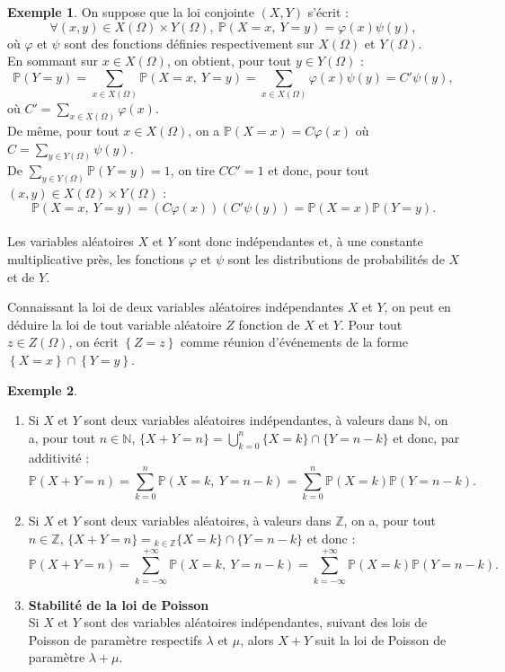 \documentclass[french]{article}
\renewcommand{\P}{\mathbb{P}}
\newcommand{\N}{\mathbb{N}}
\newcommand{\Z}{\mathbb{Z}}
\theoremstyle{plain}
\theoremstyle{definition}
\newtheorem*{ex}{Exemple}
\theoremstyle{remark}
\begin{document}
\begin{ex}
	On suppose que la loi conjointe $(X,Y)$ s'écrit :
	$$\forall (x,y)\in X(\Omega)\times Y(\Omega),\ \P(X=x,\ Y=y)=\varphi(x)\psi(y),$$ où $\varphi$ et $\psi$ sont des fonctions définies respectivement sur $X(\Omega)$ et $Y(\Omega)$. \\
	En sommant sur $x\in X(\Omega)$, on obtient, pour tout $y\in Y(\Omega)$ : $$\P(Y=y)=\sum_{x\in X(\Omega)}\P(X=x,\ Y=y)=\sum_{x\in X(\Omega)}\varphi(x)\psi(y)=C'\psi(y),$$ où $C'=\displaystyle\sum_{x\in X(\Omega)}\varphi(x)$.\\
	De même, pour tout $x\in X(\Omega)$, on a $\P(X=x)=C\varphi(x)$ où $C=\displaystyle\sum_{y\in Y(\Omega)}\psi(y)$. \\
	De $\displaystyle\sum_{y\in Y(\Omega)}\P(Y=y)=1$, on tire $CC'=1$ et donc, pour tout $(x,y)\in X(\Omega)\times Y(\Omega)$ :
	$$\P(X=x,\ Y=y)=(C\varphi(x))(C'\psi(y))=\P(X=x)\P(Y=y).$$
	\\
	Les variables aléatoires $X$ et $Y$ sont donc indépendantes et, à une constante multiplicative près, les fonctions $\varphi$ et $\psi$ sont les distributions de probabilités de $X$ et de $Y$.
\end{ex}

\begin{met}
	Connaissant la loi de deux variables aléatoires indépendantes $X$ et $Y$, on peut en déduire la loi de tout variable aléatoire $Z$ fonction de $X$ et $Y$. Pour tout $z\in Z(\Omega)$, on écrit $\left\{Z=z\right\}$ comme réunion d'événements de la forme $\left\{X=x\right\}\cap\left\{Y=y\right\}$.
\end{met}

\begin{ex}
	\begin{enumerate}
		\item Si $X$ et $Y$ sont deux variables aléatoires indépendantes, à valeurs dans $\N$, on a, pour tout $n\in\N$, $\{X+Y=n\}=\displaystyle\bigcup_{k=0}^n\{X=k\}\cap\{Y=n-k\}$ et donc, par additivité :
		$$\P(X+Y=n)=\sum_{k=0}^{n}\P(X=k,\ Y=n-k)=\sum_{k=0}^{n}\P(X=k)\P(Y=n-k).$$
		\item Si $X$ et $Y$ sont deux variables aléatoires, à valeurs dans $\Z$, on a, pour tout $n\in\Z$, $\{X+Y=n\}=\displaystyle_{k\in\Z}\{X=k\}\cap\{Y=n-k\}$ et donc :
		$$\P(X+Y=n)=\sum_{k=-\infty}^{+\infty}\P(X=k,\ Y=n-k)=\sum_{k=-\infty}^{+\infty}\P(X=k)\P(Y=n-k).$$
		\item \textbf{Stabilité de la loi de Poisson}\\
		Si $X$ et $Y$ sont des variables aléatoires indépendantes, suivant des lois de Poisson de paramètre respectifs $\lambda$ et $\mu$, alors $X+Y$ suit la loi de Poisson de paramètre $\lambda+\mu$.
	\end{enumerate}
\end{ex}
\end{document}

